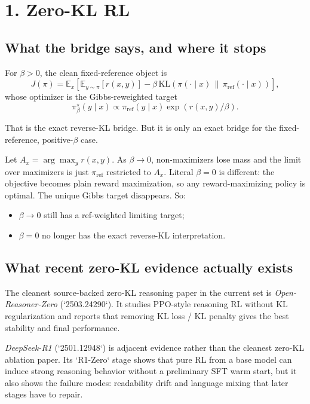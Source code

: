 \documentclass[11pt]{article}
\begin{document}
\section*{1. Zero-KL RL}

\subsection*{What the bridge says, and where it stops}

For $\beta > 0$, the clean fixed-reference object is
\[
J(\pi)=\mathbb{E}_x\left[\mathbb{E}_{y \sim \pi}[r(x,y)]-\beta\,\mathrm{KL}\!\left(\pi(\cdot \mid x)\,\|\,\pi_{\mathrm{ref}}(\cdot \mid x)\right)\right],
\]
whose optimizer is the Gibbs-reweighted target
\[
\pi^\star_\beta(y \mid x)\propto \pi_{\mathrm{ref}}(y \mid x)\exp(r(x,y)/\beta).
\]

That is the exact reverse-KL bridge. But it is only an exact bridge for the fixed-reference, positive-$\beta$ case.

Let $A_x = \arg\max_y r(x,y)$. As $\beta \to 0$, non-maximizers lose mass and the limit over maximizers is just $\pi_{\mathrm{ref}}$ restricted to $A_x$. Literal $\beta = 0$ is different: the objective becomes plain reward maximization, so any reward-maximizing policy is optimal. The unique Gibbs target disappears. So:

\begin{itemize}
\item $\beta \to 0$ still has a ref-weighted limiting target;
\item $\beta = 0$ no longer has the exact reverse-KL interpretation.
\end{itemize}

\subsection*{What recent zero-KL evidence actually exists}

The cleanest source-backed zero-KL reasoning paper in the current set is \emph{Open-Reasoner-Zero} (`2503.24290`). It studies PPO-style reasoning RL without KL regularization and reports that removing KL loss / KL penalty gives the best stability and final performance.

\emph{DeepSeek-R1} (`2501.12948`) is adjacent evidence rather than the cleanest zero-KL ablation paper. Its `R1-Zero` stage shows that pure RL from a base model can induce strong reasoning behavior without a preliminary SFT warm start, but it also shows the failure modes: readability drift and language mixing that later stages have to repair.
\end{document}
